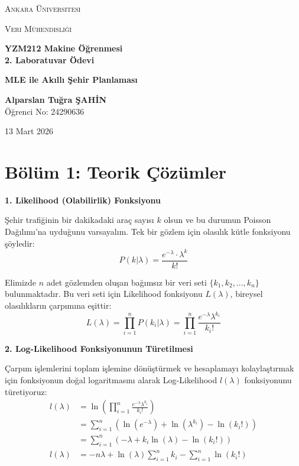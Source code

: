 \documentclass[12pt,a4paper]{article}
\begin{document}
	
	\begin{titlepage}
		\centering
		\vspace*{3cm}
		
		{\scshape\LARGE Ankara Üniversitesi \par}
		\vspace{1cm}
		{\scshape\Large Veri Mühendisliği \par}
		\vspace{1.5cm}
		
		{\Large \textbf{YZM212 Makine Öğrenmesi}}\\[0.5cm]
		{\large \textbf{2. Laboratuvar Ödevi}}
		
		\vspace{2cm}
		{\huge\bfseries MLE ile Akıllı Şehir Planlaması\par}
		\vspace{2cm}
		
		{\Large \textbf{Alparslan Tuğra ŞAHİN}}\\[0.5cm]
		{\large Öğrenci No: 24290636}
		
		\vfill
		{\large 13 Mart 2026 \par}
	\end{titlepage}
	
	\section*{Bölüm 1: Teorik Çözümler}
	
	\textbf{1. Likelihood (Olabilirlik) Fonksiyonu}
	
	Şehir trafiğinin bir dakikadaki araç sayısı $k$ olsun ve bu durumun Poisson Dağılımı'na uyduğunu varsayalım. Tek bir gözlem için olasılık kütle fonksiyonu şöyledir:
	\begin{equation*}
		P(k|\lambda) = \frac{e^{-\lambda}\cdot\lambda^{k}}{k!}
	\end{equation*}
	
	Elimizde $n$ adet gözlemden oluşan bağımsız bir veri seti $\{k_{1},k_{2},...,k_{n}\}$ bulunmaktadır. Bu veri seti için Likelihood fonksiyonu $L(\lambda)$, bireysel olasılıkların çarpımına eşittir:
	\begin{equation*}
		L(\lambda) = \prod_{i=1}^{n} P(k_{i}|\lambda) = \prod_{i=1}^{n} \frac{e^{-\lambda}\lambda^{k_{i}}}{k_{i}!}
	\end{equation*}
	
	\textbf{2. Log-Likelihood Fonksiyonunun Türetilmesi}
	
	Çarpım işlemlerini toplam işlemine dönüştürmek ve hesaplamayı kolaylaştırmak için fonksiyonun doğal logaritmasını alarak Log-Likelihood $l(\lambda)$ fonksiyonunu türetiyoruz:
	\begin{align*}
		l(\lambda) &= \ln\left(\prod_{i=1}^{n} \frac{e^{-\lambda}\lambda^{k_{i}}}{k_{i}!}\right) \\
		&= \sum_{i=1}^{n} \left( \ln(e^{-\lambda}) + \ln(\lambda^{k_{i}}) - \ln(k_{i}!) \right) \\
		&= \sum_{i=1}^{n} \left( -\lambda + k_{i}\ln(\lambda) - \ln(k_{i}!) \right) \\
		l(\lambda) &= -n\lambda + \ln(\lambda)\sum_{i=1}^{n} k_{i} - \sum_{i=1}^{n} \ln(k_{i}!)
	\end{align*}
	
\end{document}
